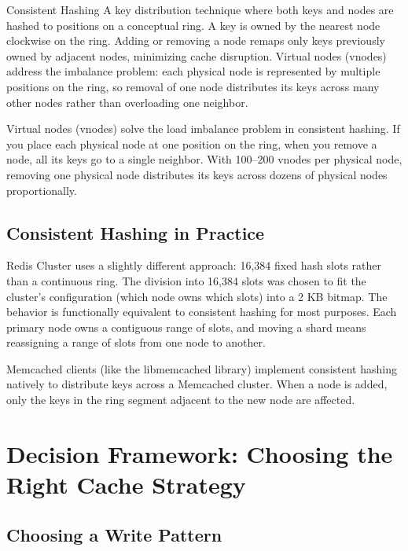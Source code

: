 \documentclass[11pt,a4paper]{article}
\begin{document}
\begin{termbox}{Consistent Hashing}
A key distribution technique where both keys and nodes are hashed to positions on a conceptual ring. A key is owned by the nearest node clockwise on the ring. Adding or removing a node remaps only keys previously owned by adjacent nodes, minimizing cache disruption. Virtual nodes (vnodes) address the imbalance problem: each physical node is represented by multiple positions on the ring, so removal of one node distributes its keys across many other nodes rather than overloading one neighbor.
\end{termbox}

Virtual nodes (vnodes) solve the load imbalance problem in consistent hashing. If you place each physical node at one position on the ring, when you remove a node, all its keys go to a single neighbor. With 100--200 vnodes per physical node, removing one physical node distributes its keys across dozens of physical nodes proportionally.

\subsection{Consistent Hashing in Practice}

Redis Cluster uses a slightly different approach: 16,384 fixed hash slots rather than a continuous ring. The division into 16,384 slots was chosen to fit the cluster's configuration (which node owns which slots) into a 2 KB bitmap. The behavior is functionally equivalent to consistent hashing for most purposes. Each primary node owns a contiguous range of slots, and moving a shard means reassigning a range of slots from one node to another.

Memcached clients (like the libmemcached library) implement consistent hashing natively to distribute keys across a Memcached cluster. When a node is added, only the keys in the ring segment adjacent to the new node are affected.

\section{Decision Framework: Choosing the Right Cache Strategy}

\subsection{Choosing a Write Pattern}
\end{document}

